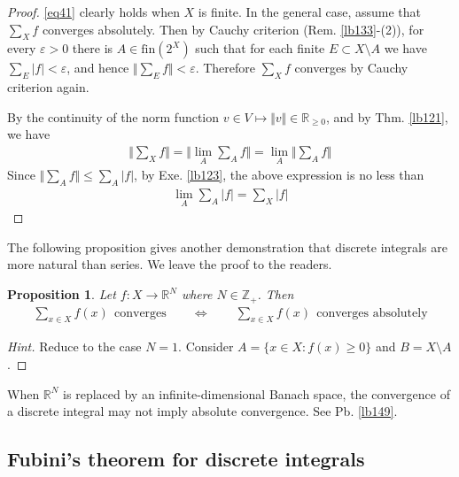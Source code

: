 \documentclass[12pt,b5paper,notitlepage]{article}
\theoremstyle{definition}
\theoremstyle{plain}
\newtheorem{pp}[df]{Proposition}
\newcommand{\Zbb}{\mathbb Z}
\newcommand{\Rbb}{\mathbb R}
\newcommand{\fin}{\mathrm{fin}}
\newcommand{\eps}{\varepsilon}
\numberwithin{equation}{section}
\begin{document}
\begin{proof}
\eqref{eq41} clearly holds when $X$ is finite. In the general case, assume that $\sum_Xf $ converges absolutely. Then by Cauchy criterion (Rem. \ref{lb133}-(2)), for every $\eps>0$ there is $A\in \fin(2^X)$ such that for each finite $E\subset X\setminus A$ we have $\sum_E|f|<\eps$, and hence $\Vert \sum_E f\Vert<\eps$. Therefore $\sum_Xf$ converges by Cauchy criterion again.

By the continuity of the norm function $v\in V\mapsto \Vert v\Vert\in\Rbb_{\geq0}$, and by Thm. \ref{lb121}, we have
\begin{align*}
\Big\Vert \sum_X f \Big\Vert=\Big\Vert \lim_A \sum_Af \Big\Vert=\lim_A \Big\Vert \sum_Af \Big\Vert
\end{align*}
Since $\Vert \sum_A f\Vert\leq\sum_A|f|$, by Exe. \ref{lb123}, the above expression is no less than
\begin{align*}
\lim_A\sum_A|f|=\sum_X|f|
\end{align*}
\end{proof}

The following proposition gives another demonstration that discrete integrals are more natural than series. We leave the proof to the readers.

\begin{pp}\label{lb134}
Let $f:X\rightarrow\Rbb^N$ where $N\in\Zbb_+$. Then
\begin{align*}
\sum_{x\in X}f(x)~~\textrm{converges}\qquad\Longleftrightarrow\qquad \sum_{x\in X}f(x)~~\text{converges absolutely}
\end{align*}

\end{pp}

\begin{proof}[Hint]
Reduce to the case $N=1$. Consider $A=\{x\in X:f(x)\geq 0\}$ and $B=X\setminus A$. 
\end{proof}

When $\Rbb^N$ is replaced by an infinite-dimensional Banach space, the convergence of a discrete integral may not imply absolute convergence. See Pb. \ref{lb149}.







\subsection{Fubini's theorem for discrete integrals}\label{lb138}
\end{document}
